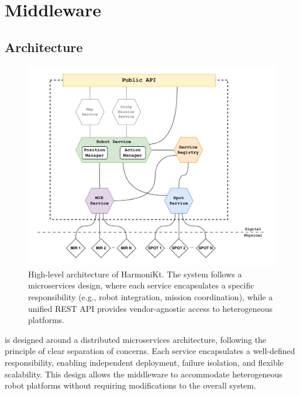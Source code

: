 \documentclass[conference]{IEEEtran}
\begin{document}
\section{\approach{} Middleware}\label{sec:arc}
\subsection{Architecture}

\begin{figure}[htb]
    \centering
    \includegraphics[width=1\columnwidth]{images/arc.pdf}
    \caption{
        High-level architecture of HarmoniKt. 
        The system follows a microservices design, 
        where each service encapsulates a specific responsibility (e.g., robot integration, mission coordination),
        while a unified REST API provides vendor-agnostic access to heterogeneous platforms.
    }
    \label{fig:arc}
\end{figure}

\approach{} is designed around a distributed microservices architecture, 
 following the principle of clear separation of concerns. 
% 
Each service encapsulates a well-defined responsibility, 
 enabling independent deployment, failure isolation, and flexible scalability. 
% 
This design allows the middleware to accommodate heterogeneous robot platforms 
 without requiring modifications to the overall system.
\end{document}
